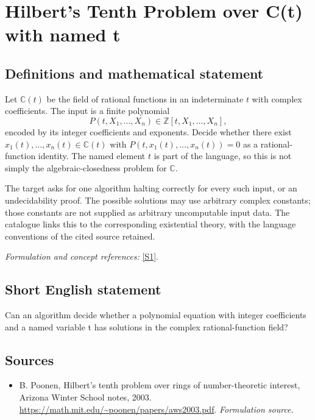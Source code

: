 \documentclass[11pt]{article}
\begin{document}
\section*{\texorpdfstring{Hilbert's Tenth Problem over C(t) with named t}{Hilbert's Tenth Problem over C(t) with named t}}\label{30006941}
\subsection{Definitions and mathematical statement}
Let ${\mathbb{C}}(t)$ be the field of rational functions in an indeterminate $t$ with complex coefficients. The input is a finite polynomial
\[
 P(t,X_1,\ldots,X_n)\in{\mathbb{Z}}[t,X_1,\ldots,X_n],
\]
encoded by its integer coefficients and exponents. Decide whether there exist $x_1(t),\ldots,x_n(t)\in{\mathbb{C}}(t)$ with $P(t,x_1(t),\ldots,x_n(t))=0$ as a rational-function identity. The named element $t$ is part of the language, so this is not simply the algebraic-closedness problem for ${\mathbb{C}}$.

The target asks for one algorithm halting correctly for every such input, or an undecidability proof. The possible solutions may use arbitrary complex constants; those constants are not supplied as arbitrary uncomputable input data. The catalogue links this to the corresponding existential theory, with the language conventions of the cited source retained.
\par\smallskip\textit{Formulation and concept references:} \href{https://math.mit.edu/~poonen/papers/aws2003.pdf}{[S1]}.

\subsection{Short English statement}
Can an algorithm decide whether a polynomial equation with integer coefficients and a named variable t has solutions in the complex rational-function field?
\subsection{Sources}
\begin{itemize}
\item[S1]B. Poonen, Hilbert's tenth problem over rings of number-theoretic interest, Arizona Winter School notes, 2003.
\url{https://math.mit.edu/~poonen/papers/aws2003.pdf}.
\textit{Formulation source.}
\end{itemize}
\end{document}

